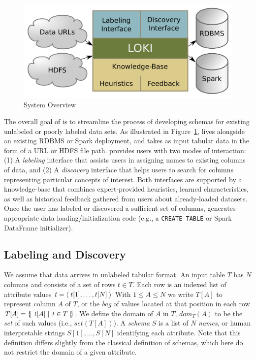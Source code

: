
\begin{figure}
\centering
\includegraphics[width=0.8\columnwidth]{graphics/system.pdf}
\caption{System Overview}
\label{fig:overview}
\end{figure}

The overall goal of \systemname is to streamline the process of developing schemas for existing unlabeled or poorly labeled data sets.  
As illustrated in Figure~\ref{fig:overview}, \systemname lives alongside an existing RDBMS or Spark deployment, and takes as input tabular data in the form of a URL or HDFS file path.
\systemname provides users with two modes of interaction: (1) A \emph{labeling} interface that assists users in assigning names to existing columns of data, and (2) A \emph{discovery} interface that helps users to search for columns representing particular concepts of interest.  
Both interfaces are supported by a knowledge-base that combines expert-provided heuristics, learned characteristics, as well as historical feedback gathered from users about already-loaded datasets.
Once the user has labeled or discovered a sufficient set of columns, \systemname generates appropriate data loading/initialization code (e.g., a \texttt{CREATE TABLE} or Spark DataFrame initializer).  


\subsection{Labeling and Discovery}

We assume that data arrives in unlabeled tabular format.  
An input table $T$ has $N$ columns and consists of a set of rows $t \in T$.
Each row is an indexed list of attribute values $t = \left<\;{t[1], \ldots, t[N]}\;\right>$
With $1 \leq A \leq N$ we write $T[A]$ to represent column $A$ of $T$, or the \emph{bag} of values located at that position in each row
$T[A] = \left\{\!\left|\left.\;{t[A]}\;\right|\;{t \in T}\;\right|\!\right\}$.
We define the domain of $A$ in $T$, $dom_T(A)$ to be the \emph{set} of such values (i.e., $set(T[A])$).  
A \emph{schema} $S$ is a list of $N$ \emph{names}, or human interpretable strings $S[1], \ldots, S[N]$ identifying each attribute.
Note that this definition differs slightly from the classical definition of schemas, which here do not restrict the domain of a given attribute.

